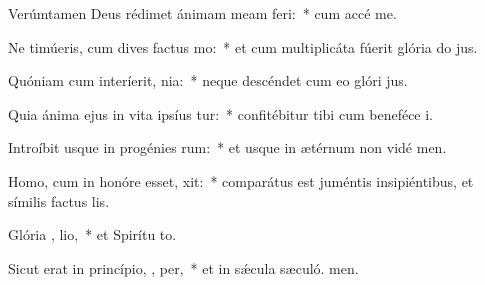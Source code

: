 \item Verúmtamen Deus rédimet ánimam meam   feri:~* cum accé me.
\item Ne timúeris, cum dives factus  mo:~* et cum multiplicáta fúerit glória do jus.
\item Quóniam cum interíerit,   nia:~* neque descéndet cum eo glóri jus.
\item Quia ánima ejus in vita ipsíus tur:~* confitébitur tibi cum beneféce i.
\item Introíbit usque in progénies  rum:~* et usque in ætérnum non vidé men.
\item Homo, cum in honóre esset,  xit:~* comparátus est juméntis insipiéntibus, et símilis factus  lis.
\item Glória ,  lio,~* et Spirítu to.
\item Sicut erat in princípio,  ,  per,~* et in sǽcula sæculó. men.
